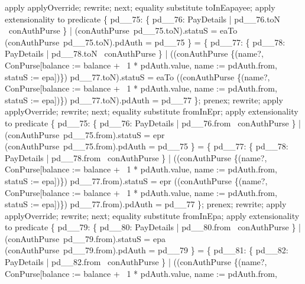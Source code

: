 \begin{LPScript}
        apply applyOverride;
        rewrite;
    next;
        equality substitute toInEapayee;
        apply extensionality to predicate
            \{ pd\_\_75: \{ pd\_\_76: PayDetails | pd\_\_76.toN \in \dom~conAuthPurse \}
              | (conAuthPurse~pd\_\_75.toN).statuS = eaTo
              \land (conAuthPurse~pd\_\_75.toN).pdAuth = pd\_\_75 \}
            = \{ pd\_\_77: \{ pd\_\_78: PayDetails | pd\_\_78.toN \in \dom~conAuthPurse \}
                | ((conAuthPurse \oplus \{(name?, \theta ConPurse[balance :=
                  balance + \negate~1 * pdAuth.value, name := pdAuth.from,
                  statuS := epa])\}) pd\_\_77.toN).statuS = eaTo
                \land ((conAuthPurse \oplus \{(name?, \theta ConPurse[balance :=
                  balance + \negate~1 * pdAuth.value, name := pdAuth.from,
                  statuS := epa])\}) pd\_\_77.toN).pdAuth = pd\_\_77 \};
        prenex;
        rewrite;
        apply applyOverride;
        rewrite;
    next;
        equality substitute fromInEpr;
        apply extensionality to predicate
            \{ pd\_\_75: \{ pd\_\_76: PayDetails | pd\_\_76.from \in \dom~conAuthPurse \}
                | (conAuthPurse~pd\_\_75.from).statuS = epr
                \land (conAuthPurse~pd\_\_75.from).pdAuth = pd\_\_75 \}
            = \{ pd\_\_77: \{ pd\_\_78: PayDetails | pd\_\_78.from \in \dom~conAuthPurse \}
                | ((conAuthPurse \oplus \{(name?, \theta ConPurse[balance :=
                  balance + \negate~1 * pdAuth.value, name := pdAuth.from,
                  statuS := epa])\}) pd\_\_77.from).statuS = epr
             \land ((conAuthPurse \oplus \{(name?, \theta ConPurse[balance :=
                  balance + \negate~1 * pdAuth.value, name := pdAuth.from,
                  statuS := epa])\}) pd\_\_77.from).pdAuth = pd\_\_77 \};
        prenex;
        rewrite;
        apply applyOverride;
        rewrite;
    next;
        equality substitute fromInEpa;
        apply extensionality to predicate
            \{ pd\_\_79: \{ pd\_\_80: PayDetails | pd\_\_80.from \in \dom~conAuthPurse \}
                | (conAuthPurse~pd\_\_79.from).statuS = epa
                \land (conAuthPurse~pd\_\_79.from).pdAuth = pd\_\_79 \}
            = \{ pd\_\_81: \{ pd\_\_82: PayDetails | pd\_\_82.from \in \dom~conAuthPurse \}
                | ((conAuthPurse \oplus \{(name?, \theta ConPurse[balance :=
                  balance + \negate~1 * pdAuth.value, name := pdAuth.from,

\end{LPScript}
